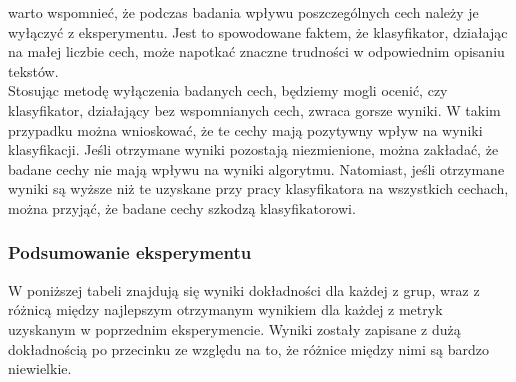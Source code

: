 \documentclass{article}
\begin{document}
\noindent warto wspomnieć, że podczas badania wpływu poszczególnych cech należy je wyłączyć z eksperymentu. Jest to spowodowane faktem, że klasyfikator, działając na małej liczbie cech, może napotkać znaczne trudności w odpowiednim opisaniu tekstów. \\

\noindent Stosując metodę wyłączenia badanych cech, będziemy mogli ocenić, czy klasyfikator, działający bez wspomnianych cech, zwraca gorsze wyniki. W takim przypadku można wnioskować, że te cechy mają pozytywny wpływ na wyniki klasyfikacji. Jeśli otrzymane wyniki pozostają niezmienione, można zakładać, że badane cechy nie mają wpływu na wyniki algorytmu. Natomiast, jeśli otrzymane wyniki są wyższe niż te uzyskane przy pracy klasyfikatora na wszystkich cechach, można przyjąć, że badane cechy szkodzą klasyfikatorowi. \\






\newpage

\subsubsection*{Podsumowanie eksperymentu}

W poniższej tabeli znajdują się wyniki dokładności dla każdej z grup, wraz z różnicą między najlepszym otrzymanym wynikiem dla każdej z metryk uzyskanym w poprzednim eksperymencie. Wyniki zostały zapisane z dużą dokładnością po przecinku ze względu na to, że różnice między nimi są bardzo niewielkie. \\
\end{document}
